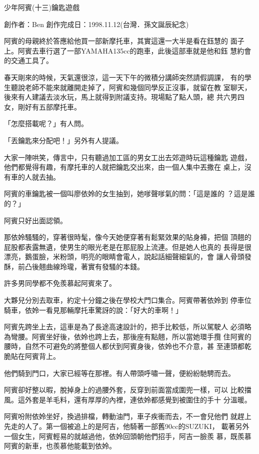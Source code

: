 



少年阿賓(十三)鑰匙遊戲

創作者：Ben
創作完成日：1998.11.12(台灣．孫文誕辰紀念)


阿賓的母親終於答應給他買一部新摩托車，其實這還一大半是看在鈺慧的
面子上。阿賓去車行選了一部YAMAHA135cc的跑車，此後這部車就是他和鈺
慧約會的交通工具了。

春天剛來的時候，天氣還很涼，這一天下午的微積分講師突然請假調課，
有的學生聽說老師不能來就離開走掉了，阿賓和幾個同學反正沒事，就留在教
室聊天，後來有人建議去淡水玩，馬上就得到附議支持。現場點了點人頭，總
共六男四女，剛好有五部摩托車。

「怎麼搭載呢？」有人問。

「丟鑰匙來分配吧！」另外有人提議。

大家一陣哄笑，傳言中，只有聽過加工區的男女工出去郊遊時玩這種鑰匙
遊戲，他們都覺得有趣，有摩托車的人就把鑰匙交出來，由一個人集中丟撒在
桌上，沒有車的人就去抽。

阿賓的車鑰匙被一個叫廖依姈的女生抽到，她嗲聲嗲氣的問：「這是誰的
？這是誰的？」

阿賓只好出面認領。

那依姈騷騷的，穿著很時髦，像今天她便穿著有鬆緊效果的貼身褲，把個
頂翹的屁股都表露無遺，使男生的眼光老是在那屁股上流連。但是她人也真的
長得是很漂亮，鵝蛋臉，米粉頭，明亮的眼睛會電人，說起話細聲細氣的，會
讓人骨頭發酥，前凸後翹曲線玲瓏，著實有發騷的本錢。

許多男同學都不免羨慕起阿賓來了。

大夥兒分別去取車，約定十分鐘之後在學校大門口集合。阿賓帶著依姈到
停車位騎車，依姈一看見那輛摩托車驚訝的說：「好大的車啊！」

阿賓先跨坐上去，這車是為了長途高速設計的，把手比較低，所以駕駛人
必須略為彎腰。阿賓坐好後，依姈也跨上去，那後座有點翹，所以當她環手攬
住阿賓的腰時，自然不可避免的將整個人都伏到阿賓身後，依姈也不介意，甚
至連頭都乾脆貼在阿賓背上。

他們騎到門口，大家已經等在那裡。有人帶頭呼嘯一聲，便紛紛馳騁而去。

阿賓卻好整以暇，脫掉身上的過腰外套，反穿到前面當成圍兜一樣，可以
比較擋風。這外套是羊毛料，還有厚厚的內裡，連依姈都感覺到被圍住的手十
分溫暖。

阿賓吩附依姈坐好，換過排檔，轉動油門，車子疾衝而去，不一會兒他們
就趕上先走的人了。第一個被追上的是阿吉，他騎著一部舊90cc的SUZUKI，
載著另外一個女生，阿賓輕易的就越過他，依姈回頭朝他們招手，阿吉一臉羨
慕，既羨慕阿賓的新車，也羨慕他能載到依姈。

